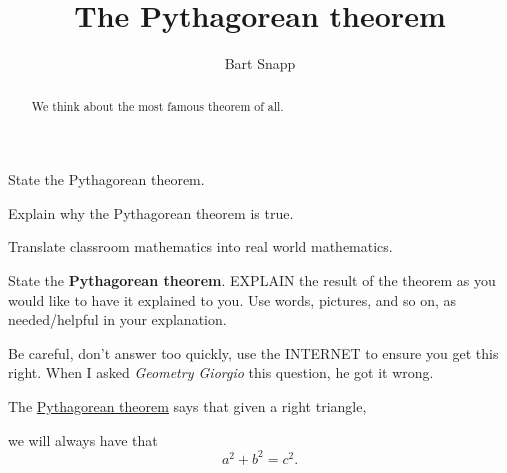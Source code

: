 \documentclass[noauthor,nooutcomes,handout,hints]{ximera}
\title{The Pythagorean theorem}
\author{Bart Snapp}
\begin{document}
\begin{abstract}
  We think about the most famous theorem of all.
\end{abstract}
\maketitle


\begin{listOutcomes}
\item{State the Pythagorean theorem.}
\item{Explain why the Pythagorean theorem is true.}
\item{Translate classroom mathematics into real world mathematics.}
\end{listOutcomes}
\mynewpage

\begin{question}
  State the \textbf{Pythagorean theorem}. EXPLAIN the result of the theorem as
  you would like to have it explained to you.  Use words, pictures,
  and so on, as needed/helpful in your explanation.
  \begin{hint}
    Be careful, don't answer too quickly, use the INTERNET to ensure
    you get this right. When I asked \textit{Geometry Giorgio} this
    question, he got it wrong.
  \end{hint}
  \begin{freeResponse}
    The \underline{Pythagorean theorem} says that given a right
    triangle,
    \begin{center}
    \end{center}
    we will always have that
    \[
    a^2 + b^2 = c^2.
    \]
  \end{freeResponse}
\end{question}
\mynewpage
\end{document}
